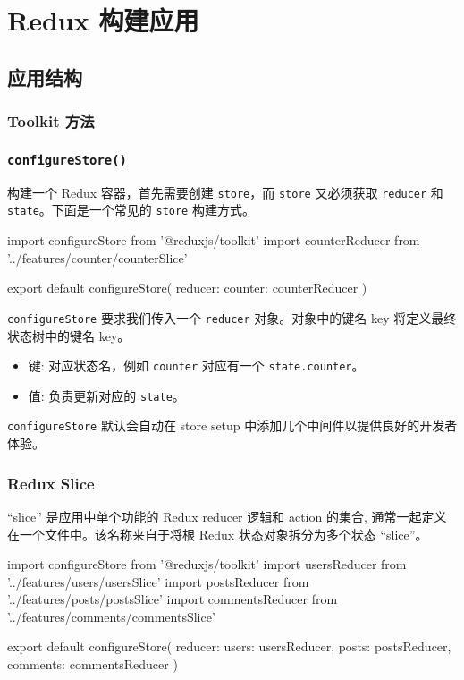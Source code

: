 \section{Redux 构建应用}

\subsection{应用结构}

\subsubsection{Toolkit 方法}

\subsubsection*{\texttt{configureStore()}}

构建一个  Redux 容器，首先需要创建 \texttt{store}，而 \texttt{store} 又必须获取 \texttt{reducer} 和 \texttt{state}。下面是一个常见的 \texttt{store} 构建方式。

\begin{JavaScript}
import { configureStore } from '@reduxjs/toolkit'
import counterReducer from '../features/counter/counterSlice'

export default configureStore({
  reducer: {
    counter: counterReducer
  }
})
\end{JavaScript}


\texttt{configureStore} 要求我们传入一个 \texttt{reducer} 对象。对象中的键名 key 将定义最终状态树中的键名 key。
\begin{itemize}
  \item 键: 对应状态名，例如 \texttt{counter} 对应有一个 \texttt{state.counter}。
  \item 值: 负责更新对应的 \texttt{state}。
\end{itemize}

\texttt{configureStore} 默认会自动在 store setup 中添加几个中间件以提供良好的开发者体验。

\subsubsection*{Redux Slice}

“slice” 是应用中单个功能的 Redux reducer 逻辑和 action 的集合, 通常一起定义在一个文件中。该名称来自于将根 Redux 状态对象拆分为多个状态 “slice”。

\begin{JavaScript}
import { configureStore } from '@reduxjs/toolkit'
import usersReducer from '../features/users/usersSlice'
import postsReducer from '../features/posts/postsSlice'
import commentsReducer from '../features/comments/commentsSlice'

export default configureStore({
  reducer: {
    users: usersReducer,
    posts: postsReducer,
    comments: commentsReducer
  }
})
\end{JavaScript}

